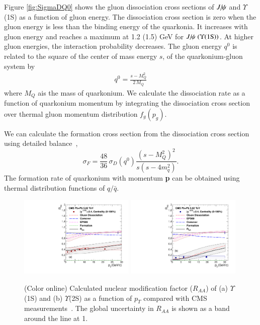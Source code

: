 {  
  Figure \ref{fig:SigmaDQ0} shows the gluon dissociation cross sections of $J\hspace{-.08em}/\hspace{-.14em}\psi$ and $\Upsilon$(1S)
  as a function of gluon energy. The dissociation cross section is zero when the gluon energy is less 
  than the binding energy of the quarkonia. It increases with gluon energy and reaches a maximum at 1.2 (1.5) GeV for 
  $J\hspace{-.08em}/\hspace{-.14em}\psi~(\Upsilon(1{\rm S}))$. At higher gluon energies, the interaction probability decreases. The gluon energy $q^0$ 
  is related to the square of the center of mass energy $s$, of the quarkonium-gluon system by
  \begin{eqnarray}
    q^{0} = \frac{s-M_{Q}^{2}}{2\,M_{Q}}
  \end{eqnarray}  
  where $M_{Q}$ ais the mass of quarkonium.  We calculate the dissociation rate as a function of quarkonium momentum 
  by integrating the dissociation cross section over thermal gluon momentum 
  distribution $f_{g}(p_g)$.


  We can calculate the formation cross section from the dissociation cross section using
  detailed balance~\cite{Thews:2000rj,Thews:2005vj},
  \begin{equation}
    \sigma_{F} = \frac{48}{36}\,\sigma_{D}(q^0)\frac{(s-M_{Q}^2)^{2}}{s(s-4m_q^{2})}.
  \end{equation}
  The formation rate of quarkonium with momentum {\bf p} can be obtained using
  thermal distribution functions of  $q/\bar{q}$.
  
  

\begin{figure}
\includegraphics[width=0.49\textwidth]{Figures/Quarkonia_502TeV/Fig7a_Y1S_CMS_RAAPt_Shade.pdf}
\includegraphics[width=0.49\textwidth]{Figures/Quarkonia_502TeV/Fig7b_Y2S_CMS_RAAPt_Shade.pdf}
\caption{(Color online) Calculated nuclear modification factor ($R_{AA}$) of (a) $\Upsilon$(1S) and 
  (b) $\Upsilon$(2S) as a function of $p_{T}$ 
  compared with CMS measurements~\cite{Sirunyan:2018nsz}.
The global uncertainty in $R_{AA}$ is shown as a band around the line at 1.
}
\label{fig:UpsilonRaaPtCMS}
\end{figure}



}
